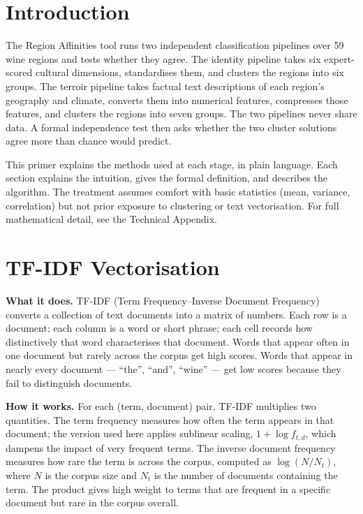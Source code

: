 \documentclass[11pt]{article}
\begin{document}

\section*{Introduction}
The Region Affinities tool runs two independent classification pipelines over 59 wine regions and tests whether they agree. The identity pipeline takes six expert-scored cultural dimensions, standardises them, and clusters the regions into six groups. The terroir pipeline takes factual text descriptions of each region's geography and climate, converts them into numerical features, compresses those features, and clusters the regions into seven groups. The two pipelines never share data. A formal independence test then asks whether the two cluster solutions agree more than chance would predict.

This primer explains the methods used at each stage, in plain language. Each section explains the intuition, gives the formal definition, and describes the algorithm. The treatment assumes comfort with basic statistics (mean, variance, correlation) but not prior exposure to clustering or text vectorisation. For full mathematical detail, see the Technical Appendix.

\section{TF-IDF Vectorisation}

\textbf{What it does.} TF-IDF (Term Frequency--Inverse Document Frequency) converts a collection of text documents into a matrix of numbers. Each row is a document; each column is a word or short phrase; each cell records how distinctively that word characterises that document. Words that appear often in one document but rarely across the corpus get high scores. Words that appear in nearly every document --- ``the'', ``and'', ``wine'' --- get low scores because they fail to distinguish documents.

\textbf{How it works.} For each (term, document) pair, TF-IDF multiplies two quantities. The term frequency measures how often the term appears in that document; the version used here applies sublinear scaling, $1 + \log f_{t,d}$, which dampens the impact of very frequent terms. The inverse document frequency measures how rare the term is across the corpus, computed as $\log(N / N_t)$, where $N$ is the corpus size and $N_t$ is the number of documents containing the term. The product gives high weight to terms that are frequent in a specific document but rare in the corpus overall.
\end{document}
